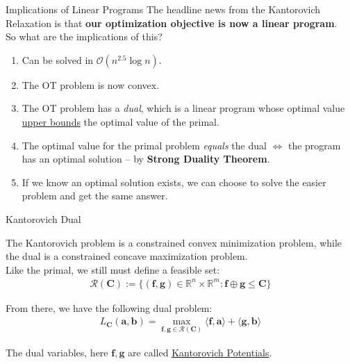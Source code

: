 \documentclass{beamer}
\begin{document}
\begin{frame}{Implications of Linear Programs}
	The headline news from the Kantorovich Relaxation is that \textbf{our optimization objective is now a linear program}. \pause \newline \\

	So what are the implications of this?
	\begin{enumerate}[label=\arabic*.]
		\item Can be solved in $\mathcal{O}(n^{2.5} \log n)$. \pause
		\item The OT problem is now convex. \pause
		\item The OT problem has a \textit{dual}, which is a linear program whose optimal value \underline{upper bounds} the optimal value of the primal. \pause
		\item The optimal value for the primal problem \textit{equals} the dual $\iff$ the program has an optimal solution -- by \textbf{Strong Duality Theorem}. \pause
		\item If we know an optimal solution exists, we can choose to solve the easier problem and get the same answer.
	\end{enumerate}
\end{frame}

\begin{frame}{Kantorovich Dual}

The Kantorovich problem is a constrained convex minimization problem, while the dual is a constrained concave maximization  problem. \pause \newline \\

Like the primal, we still must define a feasible set:
\begin{gather}
	\mathcal{R}(\bm{C}) := \{ (\bm{f}, \bm{g}) \in \mathbb{R}^n \times \mathbb{R}^m : \bm{f} \oplus \bm{g} \leq \bm{C}\}
\end{gather} \pause

From there, we have the following dual problem:
\begin{gather}
	L_{\bm{C}}(\bm{a}, \bm{b}) = \max_{\bm{f}, \bm{g} \in \mathcal{R}(\bm{C})} \langle \bm{f}, \bm{a} \rangle + \langle \bm{g}, \bm{b} \rangle
\end{gather}

	The dual variables, here $\bm{f}, \bm{g}$ are called \underline{Kantorovich Potentials}.
\end{frame}
\end{document}
